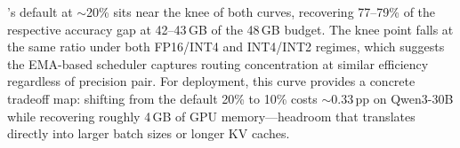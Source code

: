 \systemname's default at ${\sim}$20\% sits near the knee of both curves, recovering 77--79\% of the respective accuracy gap at 42--43\,GB of the 48\,GB budget. The knee point falls at the same ratio under both FP16/INT4 and INT4/INT2 regimes, which suggests the EMA-based scheduler captures routing concentration at similar efficiency regardless of precision pair. For deployment, this curve provides a concrete tradeoff map: shifting from the default 20\% to 10\% costs ${\sim}$0.33\,pp on Qwen3-30B while recovering roughly 4\,GB of GPU memory---headroom that translates directly into larger batch sizes or longer KV caches.
